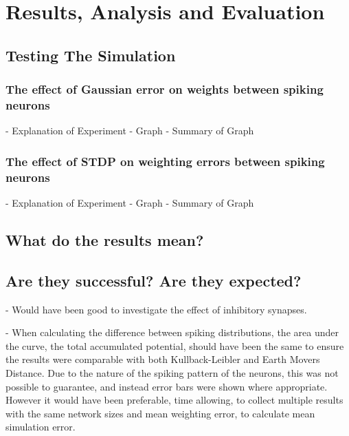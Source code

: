 

\chapter{Results, Analysis and Evaluation}

\section{Testing The Simulation}

\subsection{The effect of Gaussian error on weights between spiking neurons}
- Explanation of Experiment
- Graph
- Summary of Graph
\subsection{The effect of STDP on weighting errors between spiking neurons}
- Explanation of Experiment
- Graph
- Summary of Graph

\section{What do the results mean?}

\section{Are they successful? Are they expected?}

- Would have been good to investigate the effect of inhibitory synapses.

- When calculating the difference between spiking distributions, the area under the curve, the total accumulated potential, should have been the same to ensure the results were comparable with both Kullback-Leibler and Earth Movers Distance. Due to the nature of the spiking pattern of the neurons, this was not possible to guarantee, and instead error bars were shown where appropriate. However it would have been preferable, time allowing, to collect multiple results with the same network sizes and mean weighting error, to calculate mean simulation error.

